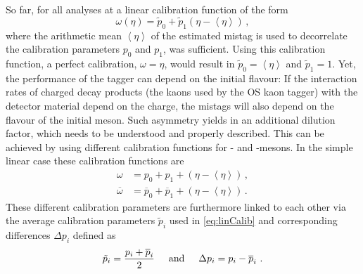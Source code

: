 So far, for all analyses at \lhcb a linear calibration function of the form
\begin{equation}
\omega(\eta)=\tilde{p}_0+\tilde{p}_1\left(\eta-\left<\eta\right>\right)\label{eq:linCalib}\,,
\end{equation}
where the arithmetic mean $\left<\eta\right>$ of the estimated mistag is used to decorrelate the calibration parameters $p_0$ and $p_1$, was sufficient.
Using this calibration function, a perfect calibration, \ie $\omega=\eta$, would result in $\tilde{p}_0=\left<\eta\right>$ and $\tilde{p}_1=1$.
Yet, the performance of the tagger can depend on the initial \B flavour:
If the interaction rates of charged decay products (\eg the kaons used by the OS kaon tagger) with the detector material depend on the charge, the mistags will also depend on the flavour of the initial \B meson.
Such asymmetry yields in an additional dilution factor, which needs to be understood and properly described.
This can be achieved by using different calibration functions for \Bz- and \Bzb-mesons.
In the simple linear case these calibration functions are
\begin{equation}
\begin{aligned}
\omega&=p_0+p_1+\left(\eta-\left<\eta\right>\right)\,,\\
\overline{\omega}&=\overline{p}_0+\overline{p}_1+\left(\eta-\left<\eta\right>\right)\,.
\end{aligned}
\end{equation}
These different calibration parameters are furthermore linked to each other via the average calibration parameters $\tilde{p}_i$ used in \cref{eq:linCalib} and corresponding differences $\Delta p_i$ defined as
\begin{equation}
\tilde{p}_i=\frac{p_i+\overline{p}_i}{2}\hspace{0.5cm}\text{and}\hspace{0.5cm}\Delta p_i=p_i-\overline{p}_i\,\,.
\end{equation}

